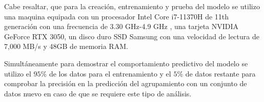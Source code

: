 Cabe resaltar, que para la creación, entrenamiento y prueba del modelo se utilizo una maquina equipada con un procesador Intel Core i7-11370H de 11th generación con una frecuencia de 3.30 GHz-4.9 GHz , una tarjeta NVIDIA GeForce RTX 3050, un disco duro SSD Samsung con una velocidad de lectura de  7,000 MB/s y 48GB de memoria RAM. 

Simultáneamente para demostrar el comportamiento predictivo del modelo se utilizo el $95\%$ de los datos para el entrenamiento y el $5\%$ de datos restante para comprobar la precisión en la predicción del agrupamiento con un conjunto de datos nuevo en caso de que se requiere este tipo de análisis.